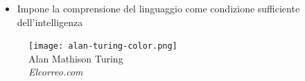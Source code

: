 \begin{frame}[t,fragile]
{\begin{minipage}[t]{\textwidth}
\begin{minipage}[t]{0.6\textwidth}
\begin{itemize}[leftmargin=10pt,align=right]
\begin{itemize}[leftmargin=10pt,align=right]
				    \end{itemize}
				    \item[\alert{\faArrowCircleRight}] Impone la comprensione del linguaggio come \alert{condizione sufficiente} dell'intelligenza
			    \end{itemize}
		    \end{minipage}
		    \begin{minipage}[t]{0.4\textwidth}
			    \centering
			    \begin{figure}[ht]
				    \texttt{[image: alan-turing-color.png]}
				    {\tiny\\Alan Mathison Turing\\\vspace*{-1pt}\textit{\textcopyright Elcorreo.com}}
			    \end{figure}
		    \end{minipage}
	    \end{minipage}
    }
\end{frame}
%
